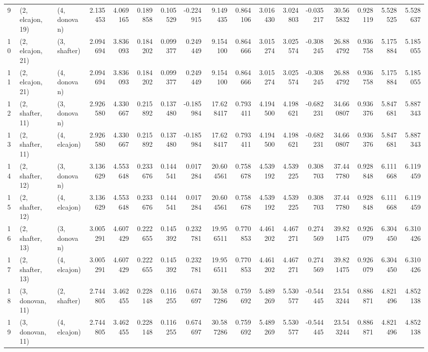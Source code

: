 \begin{tabular}{lllrrrrrrrrrrrrrr}
9  &  (2, elcajon, 19) &     (4, donovan) &  2.135453 &  4.069165 &   0.189858 &  0.105529 & -0.224915 &   9.149435 &  0.864106 &   3.016430 &  3.024803 & -0.035217 &  30.565832 &  0.928119 &  5.528525 &  5.528637 \\
10 &  (2, elcajon, 21) &     (3, shafter) &  2.094694 &  3.836093 &   0.184202 &  0.099377 &  0.249449 &   9.154100 &  0.864666 &   3.015274 &  3.025574 & -0.308245 &  26.884792 &  0.936758 &  5.175884 &  5.185055 \\
11 &  (2, elcajon, 21) &     (4, donovan) &  2.094694 &  3.836093 &   0.184202 &  0.099377 &  0.249449 &   9.154100 &  0.864666 &   3.015274 &  3.025574 & -0.308245 &  26.884792 &  0.936758 &  5.175884 &  5.185055 \\
12 &  (2, shafter, 11) &     (3, donovan) &  2.926580 &  4.330667 &   0.215892 &  0.137480 & -0.185984 &  17.628417 &  0.793411 &   4.194500 &  4.198621 & -0.682231 &  34.660807 &  0.936376 &  5.847681 &  5.887343 \\
13 &  (2, shafter, 11) &     (4, elcajon) &  2.926580 &  4.330667 &   0.215892 &  0.137480 & -0.185984 &  17.628417 &  0.793411 &   4.194500 &  4.198621 & -0.682231 &  34.660807 &  0.936376 &  5.847681 &  5.887343 \\
14 &  (2, shafter, 12) &     (3, donovan) &  3.136629 &  4.553648 &   0.233676 &  0.144541 &  0.017284 &  20.604561 &  0.758678 &   4.539192 &  4.539225 &  0.308703 &  37.447780 &  0.928848 &  6.111668 &  6.119459 \\
15 &  (2, shafter, 12) &     (4, elcajon) &  3.136629 &  4.553648 &   0.233676 &  0.144541 &  0.017284 &  20.604561 &  0.758678 &   4.539192 &  4.539225 &  0.308703 &  37.447780 &  0.928848 &  6.111668 &  6.119459 \\
16 &  (2, shafter, 13) &     (3, donovan) &  3.005291 &  4.607429 &   0.222655 &  0.145392 &  0.232781 &  19.956511 &  0.770853 &   4.461202 &  4.467271 &  0.274569 &  39.821475 &  0.926079 &  6.304450 &  6.310426 \\
17 &  (2, shafter, 13) &     (4, elcajon) &  3.005291 &  4.607429 &   0.222655 &  0.145392 &  0.232781 &  19.956511 &  0.770853 &   4.461202 &  4.467271 &  0.274569 &  39.821475 &  0.926079 &  6.304450 &  6.310426 \\
18 &  (3, donovan, 11) &     (2, shafter) &  2.744805 &  3.462455 &   0.228148 &  0.116255 &  0.674697 &  30.587286 &  0.759692 &   5.489269 &  5.530577 & -0.544445 &  23.543244 &  0.886871 &  4.821496 &  4.852138 \\
19 &  (3, donovan, 11) &     (4, elcajon) &  2.744805 &  3.462455 &   0.228148 &  0.116255 &  0.674697 &  30.587286 &  0.759692 &   5.489269 &  5.530577 & -0.544445 &  23.543244 &  0.886871 &  4.821496 &  4.852138 \\

\end{tabular}
